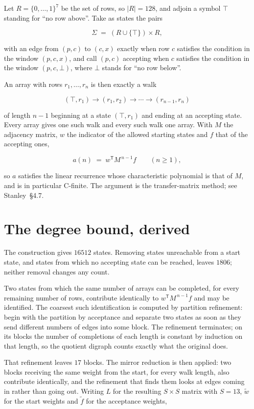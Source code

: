 \documentclass[11pt]{article}
\theoremstyle{definition}
\begin{document}
Let $R = \{0,\dots,1\}^{7}$ be the set of rows, so $|R| = 128$, and adjoin a symbol $\top$ standing for ``no row above''. Take as states the pairs

\[\Sigma \;=\; (R \cup \{\top\}) \times R,\]

with an edge from $(p,c)$ to $(c,x)$ exactly when row $c$ satisfies the condition in the window $(p,c,x)$, and call $(p,c)$ accepting when $c$ satisfies the condition in the window $(p,c,\bot)$, where $\bot$ stands for ``no row below''.

An array with rows $r_1,\dots,r_n$ is then exactly a walk

\[(\top,r_1) \to (r_1,r_2) \to \cdots \to (r_{n-1},r_n)\]

of length $n-1$ beginning at a state $(\top,r_1)$ and ending at an accepting state. Every array gives one such walk and every such walk one array. With $M$ the adjacency matrix, $w$ the indicator of the allowed starting states and $f$ that of the accepting ones,

\[a(n) \;=\; w^{\mathsf T} M^{\,n-1} f \qquad (n \ge 1),\]

so $a$ satisfies the linear recurrence whose characteristic polynomial is that of $M$, and is in particular C-finite. The argument is the transfer-matrix method; see Stanley~\S4.7.

\section{The degree bound, derived}

The construction gives $16512$ states. Removing states unreachable from a start state, and states from which no accepting state can be reached, leaves $1806$; neither removal changes any count.

Two states from which the same number of arrays can be completed, for every remaining number of rows, contribute identically to $w^{\mathsf T}M^{\,n-1}f$ and may be identified. The coarsest such identification is computed by partition refinement: begin with the partition by acceptance and separate two states as soon as they send different numbers of edges into some block. The refinement terminates; on its blocks the number of completions of each length is constant by induction on that length, so the quotient digraph counts exactly what the original does.

That refinement leaves $17$ blocks. The mirror reduction is then applied: two blocks receiving the same weight from the start, for every walk length, also contribute identically, and the refinement that finds them looks at edges coming in rather than going out. Writing $L$ for the resulting $S \times S$ matrix with $S = 13$, $\tilde w$ for the start weights and $\tilde f$ for the acceptance weights,
\end{document}
